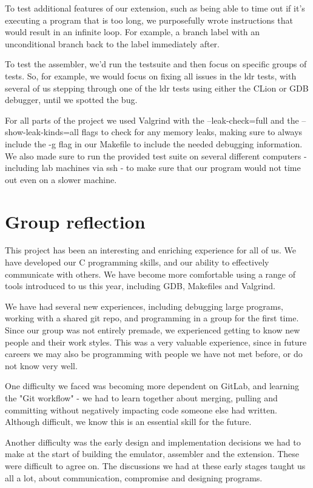 \documentclass[11pt]{article}
\begin{document}
To test additional features of our extension, such as being able to time out if it's executing a program that is too long, we purposefully wrote instructions that would result in an infinite loop. For example, a branch label with an unconditional branch back to the label immediately after.

To test the assembler, we'd run the testsuite and then focus on specific groups of tests. So, for example, we would focus on fixing all issues in the ldr tests, with several of us stepping through one of the ldr tests using either the CLion or GDB debugger, until we spotted the bug. 

For all parts of the project we used Valgrind with the --leak-check=full and the --show-leak-kinds=all flags to check for any memory leaks, making sure to always include the -g flag in our Makefile to include the needed debugging information. We also made sure to run the provided test suite on several different computers - including lab machines via ssh - to make sure that our program would not time out even on a slower machine. 

\section*{Group reflection}

This project has been an interesting and enriching experience for all of us. We have developed our C programming skills, and our ability to effectively communicate with others. We have become more comfortable using a range of tools introduced to us this year, including GDB, Makefiles and Valgrind. 

We have had several new experiences, including debugging large programs, working with a shared git repo, and programming in a group for the first time. Since our group was not entirely premade, we experienced getting to know new people and their work styles. This was a very valuable experience, since in future careers we may also be programming with people we have not met before, or do not know very well. 

One difficulty we faced was becoming more dependent on GitLab, and learning the "Git workflow" - we had to learn together about merging, pulling and committing without negatively impacting code someone else had written. Although difficult, we know this is an essential skill for the future. 

Another difficulty was the early design and implementation decisions we had to make at the start of building the emulator, assembler and the extension. These were difficult to agree on. The discussions we had at these early stages taught us all a lot, about communication, compromise and designing programs.
\end{document}
